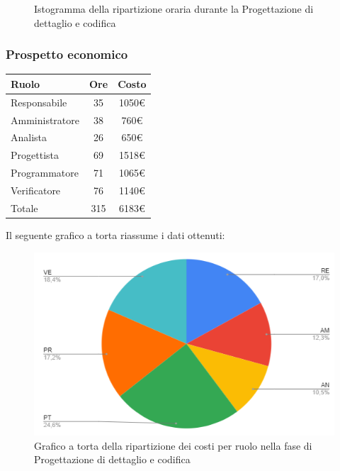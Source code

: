 {{{{{{{{{{{{{{{{\begin{figure}[!h]
\begin{center}
						\caption{Istogramma della ripartizione oraria durante la Progettazione di
							dettaglio e codifica}
					\end{center}
				\end{figure}
				\clearpage
				\subsubsection{Prospetto economico}\label{PreventivoFaseDiProgettazioneDiDettaglioECodificaProspettoEconomico}
				\quad
				\def\tabularxcolumn#1{m{#1}}
				{
					\begin{center}
						\renewcommand{\arraystretch}{1.4}
						\begin{tabularx}{7cm}{|X|c|c|}
							\hline
							\rowcolor{airforceblue}
							\textbf{Ruolo} & \textbf{Ore} & \textbf{Costo}\\
							\hline
							Responsabile & 35 & 1050\euro\\
							\hline
							Amministratore & 38 & 760\euro\\
							\hline
							Analista & 26 & 650\euro\\
							\hline
							Progettista & 69 & 1518\euro\\
							\hline
							Programmatore & 71 & 1065\euro\\
							\hline
							Verificatore & 76 & 1140\euro\\
							\hline
							Totale & 315 & 6183\euro\\
							\hline
						\end{tabularx}
					\end{center}
					
					Il seguente grafico a torta riassume i dati ottenuti:
					\begin{figure}[!ht]
						\begin{center}
							\includegraphics[width=0.8\linewidth]{../immagini/pdp/torta_progettazione_dettaglio.png}
							\caption{Grafico a torta della ripartizione dei costi per ruolo nella fase di Progettazione
								di dettaglio e codifica}
						\end{center}
					\end{figure}

}}}}}}}}}}}}}}}}}
